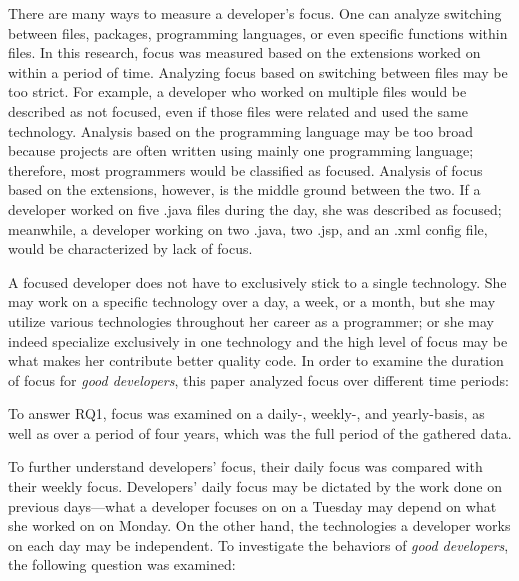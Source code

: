 There are many ways to measure a developer’s focus. One can analyze switching between files, packages, programming languages, or even specific functions within files. In this research, focus was measured based on the extensions worked on within a period of time. Analyzing focus based on switching between files may be too strict. For example, a developer who worked on multiple files would be described as not focused, even if those files were related and used the same technology. Analysis based on the programming language may be too broad because projects are often written using mainly one programming language; therefore, most programmers would be classified as focused. Analysis of focus based on the extensions, however, is the middle ground between the two. If a developer worked on five .java files during the day, she was described as focused; meanwhile, a developer working on two .java, two .jsp, and an .xml config file, would be characterized by lack of focus. \par

A focused developer does not have to exclusively stick to a single technology. She may work on a specific technology over a day, a week, or a month, but she may utilize various technologies throughout her career as a programmer; or she may indeed specialize exclusively in one technology and the high level of focus may be what makes her contribute better quality code. In order to examine the duration of focus for \textit{good developers}, this paper analyzed focus over different time periods: \par

\vspace{5mm}
\noindent{}
\vspace{2mm}

To answer RQ1, focus was examined on a daily-, weekly-, and yearly-basis, as well as over a period of four years, which was the full period of the gathered data. \par

To further understand developers’ focus, their daily focus was compared with their weekly focus. Developers’ daily focus may be dictated by the work done on previous days—what a developer focuses on on a Tuesday may depend on what she worked on on Monday. On the other hand, the technologies a developer works on each day may be independent. To investigate the behaviors of \textit{good developers}, the following question was examined: \par

